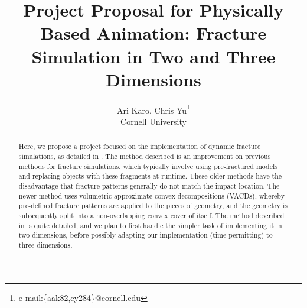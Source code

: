 \documentclass[tog]{acmsiggraph}
\title{Project Proposal for Physically Based Animation: Fracture
  Simulation in Two and Three Dimensions}
\author{Ari Karo, Chris
  Yu\thanks{e-mail:\{aak82,cy284\}@cornell.edu}\\Cornell University}
\begin{document}



\maketitle


\begin{abstract}

Here, we propose a project focused on the implementation of dynamic
fracture simulations, as detailed in \cite{Mul13}. The method
described is an improvement on previous methods for fracture
simulations, which typically involve using pre-fractured models and
replacing objects with these fragments at runtime. These older methods
have the disadvantage that fracture patterns generally do not match
the impact location. The newer method uses volumetric approximate
convex decompositions (VACDs), whereby pre-defined fracture patterns
are applied to the pieces of geometry, and the geometry is
subsequently split into a non-overlapping convex cover of itself.  The
method described in \cite{Mul13} is quite detailed, and we plan to
first handle the simpler task of implementing it in two dimensions,
before possibly adapting our implementation (time-permitting) to three
dimensions.

\end{abstract}
\end{document}
